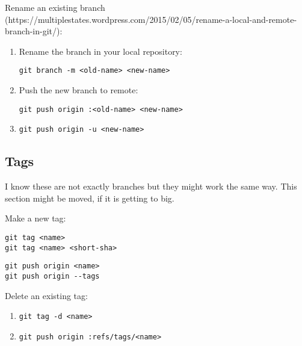\documentclass{article}
\begin{document}
Rename an existing branch (https://multiplestates.wordpress.com/2015/02/05/rename-a-local-and-remote-branch-in-git/):
\begin{enumerate}
    \item Rename the branch in your local repository:
    \begin{verbatim}
git branch -m <old-name> <new-name>
    \end{verbatim}
    \item Push the new branch to remote:
    \begin{verbatim}
git push origin :<old-name> <new-name>
    \end{verbatim}
    \item 
    \begin{verbatim}
git push origin -u <new-name>
    \end{verbatim}
\end{enumerate}

\subsection{Tags}
I know these are not exactly branches but they might work the same way. This section might be moved, if it is getting to big.

Make a new tag:
\begin{emunterate}
    \item
    \begin{verbatim}
git tag <name>
git tag <name> <short-sha>
    \end{verbatim}
    \item
    \begin{verbatim}
git push origin <name>
git push origin --tags
    \end{verbatim}
\end{emunterate}

Delete an existing tag:
\begin{enumerate}
    \item 
    \begin{verbatim}
git tag -d <name>
    \end{verbatim}
    \item
    \begin{verbatim}
git push origin :refs/tags/<name>
    \end{verbatim}
\end{enumerate}
\end{document}
